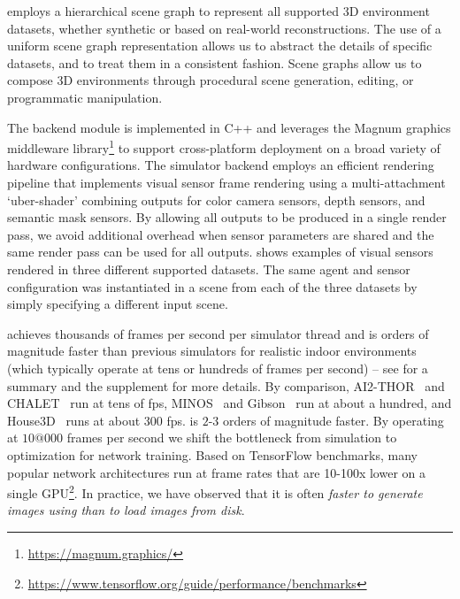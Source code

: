 \habitatsim employs a hierarchical scene graph to 
represent all supported 3D environment datasets, 
whether synthetic or based on real-world reconstructions.
The use of a uniform scene graph representation allows us to abstract the details of specific datasets, and to treat them in a consistent fashion.
Scene graphs allow us to compose 3D environments through procedural scene generation, editing, or programmatic manipulation.



The \habitatsim backend module is implemented in C++ and leverages the Magnum graphics middleware library\footnote{\url{https://magnum.graphics/}} to support cross-platform deployment on a broad variety of hardware configurations.
The simulator backend employs an efficient rendering pipeline that implements visual sensor frame rendering using a multi-attachment `uber-shader' combining outputs for color camera sensors, depth sensors, and semantic mask sensors.
By allowing all outputs to be produced in a single render pass, we avoid additional overhead when sensor parameters are shared and the same render pass can be used for all outputs.
 shows examples of visual sensors rendered in three different supported datasets.
The same agent and sensor configuration was instantiated in a scene from each of the three datasets by simply specifying a different input scene.



\habitatsim achieves thousands of frames per second per simulator thread and is orders of magnitude faster than previous simulators for realistic indoor environments (which typically operate at tens or hundreds of frames per second) -- see  for a summary and the supplement for more details.
By comparison, AI2-THOR~\cite{Kolve2017} and CHALET~\cite{Yan2018} run at tens of fps, MINOS~\cite{Savva2017} and Gibson~\cite{Xia2018} run at about a hundred, and House3D~\cite{Wu2018} runs at about $300$ fps. \habitatsim is $2$-$3$ orders of magnitude faster.
%
By operating at $10@000$ frames per second we shift the bottleneck from simulation to optimization for network training.
Based on TensorFlow benchmarks, many popular network architectures run at frame rates that are 10-100x lower on a single GPU\footnote{\url{https://www.tensorflow.org/guide/performance/benchmarks}}.
In practice, we have observed that it is often \emph{faster to generate images using \habitatsim than to load images from disk}.


